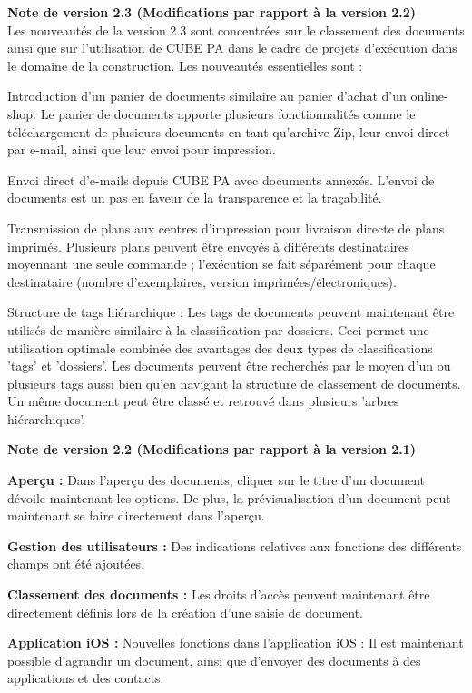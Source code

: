 \vspace{\baselineskip}

\textbf{Note de version 2.3 (Modifications par rapport à la version 2.2)} \\

Les nouveautés de la version 2.3 sont concentrées sur le classement des documents ainsi que sur l'utilisation de CUBE PA dans le cadre de projets d'exécution dans le domaine de la construction. Les nouveautés essentielles sont :
\begin{compactitem}
	\item Introduction d'un panier de documents similaire au panier d'achat d'un online-shop. Le panier de documents apporte plusieurs fonctionnalités comme le téléchargement de plusieurs documents en tant qu'archive Zip, leur envoi direct par e-mail, ainsi que leur envoi pour impression.
	\item Envoi direct d'e-mails depuis CUBE PA avec documents annexés. L'envoi de documents est un pas en faveur de la transparence et la traçabilité.
	\item Transmission de plans aux centres d'impression pour livraison directe de plans imprimés. Plusieurs plans peuvent être envoyés à différents destinataires moyennant une seule commande ; l'exécution se fait séparément pour chaque destinataire (nombre d'exemplaires, version imprimées/électroniques).
	\item Structure de tags hiérarchique : Les tags de documents peuvent maintenant être utilisés de manière similaire à la classification par dossiers. Ceci permet une utilisation optimale combinée des avantages des deux types de classifications 'tags' et 'dossiers'. Les documents peuvent être recherchés par le moyen d'un ou plusieurs tags aussi bien qu'en navigant la structure de classement de documents. Un même document peut être classé et retrouvé dans plusieurs 'arbres hiérarchiques'.
\end{compactitem}

\vspace{\baselineskip}

\textbf{Note de version 2.2 (Modifications par rapport à la version 2.1)} \\

\begin{compactitem}
	\item \textbf{Aperçu :} Dans l'aperçu des documents, cliquer sur le titre d'un document dévoile maintenant les options. De plus, la prévisualisation d'un document peut maintenant se faire directement dans l'aperçu.
	\item \textbf{Gestion des utilisateurs :} Des indications relatives aux fonctions des différents champs ont été ajoutées.
	\item \textbf{Classement des documents :} Les droits d'accès peuvent maintenant être directement définis lors de la création d'une saisie de document.
	\item \textbf{Application iOS :} Nouvelles fonctions dans l'application iOS : Il est maintenant possible d'agrandir un document, ainsi que d'envoyer des documents à des applications et des contacts.
\end{compactitem}

